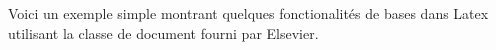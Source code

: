 \documentclass[Master.tex]{subfiles}
\begin{document}
Voici un exemple simple montrant quelques fonctionalités de bases dans Latex utilisant la classe de document fourni par Elsevier.
\end{document}
